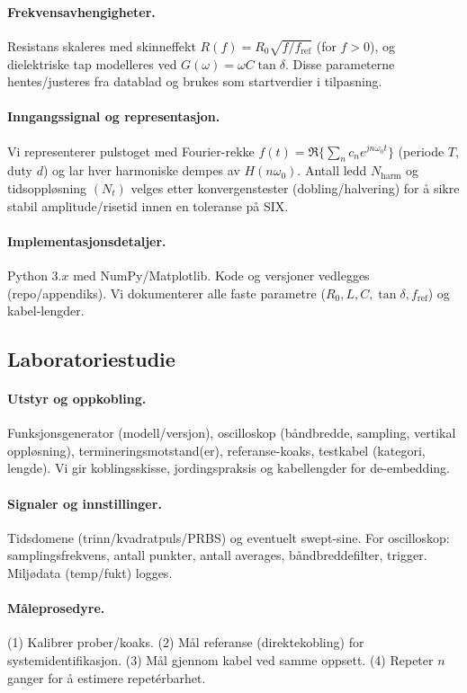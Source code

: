 \paragraph{Frekvensavhengigheter.}
Resistans skaleres med skinneffekt $R(f)=R_0\sqrt{f/f_\mathrm{ref}}$ (for $f>0$), og dielektriske tap modelleres ved
$G(\omega)=\omega C \tan\delta$. Disse parameterne hentes/justeres fra datablad og brukes som startverdier i tilpasning.

\paragraph{Inngangssignal og representasjon.}
Vi representerer pulstoget med Fourier-rekke $f(t)=\Re\{\sum_n c_n e^{jn\omega_0 t}\}$ (periode $T$, duty $d$) og lar hver harmoniske dempes av $H(n\omega_0)$. Antall ledd $N_\text{harm}$ og tidsoppløsning $(N_t)$ velges etter konvergenstester (dobling/halvering) for å sikre stabil amplitude/risetid innen en toleranse på SIX.

\paragraph{Implementasjonsdetaljer.}
Python $3.x$ med NumPy/Matplotlib. Kode og versjoner vedlegges (repo/appendiks). Vi dokumenterer alle faste parametre ($R_0,L,C,\tan\delta,f_\mathrm{ref}$) og kabel-lengder.

\subsection{Laboratoriestudie}
\paragraph{Utstyr og oppkobling.}
Funksjonsgenerator (modell/versjon), oscilloskop (båndbredde, sampling, vertikal oppløsning), termineringsmotstand(er), referanse-koaks, testkabel (kategori, lengde). Vi gir koblingsskisse, jordingspraksis og kabellengder for de-embedding.

\paragraph{Signaler og innstillinger.}
Tidsdomene (trinn/kvadratpuls/PRBS) og eventuelt swept-sine. For oscilloskop: samplingsfrekvens, antall punkter, antall averages, båndbreddefilter, trigger. Miljødata (temp/fukt) logges.

\paragraph{Måleprosedyre.}
(1) Kalibrer prober/koaks. (2) Mål referanse (direktekobling) for systemidentifikasjon.
(3) Mål gjennom kabel ved samme oppsett. (4) Repeter $n$ ganger for å estimere repetérbarhet.

